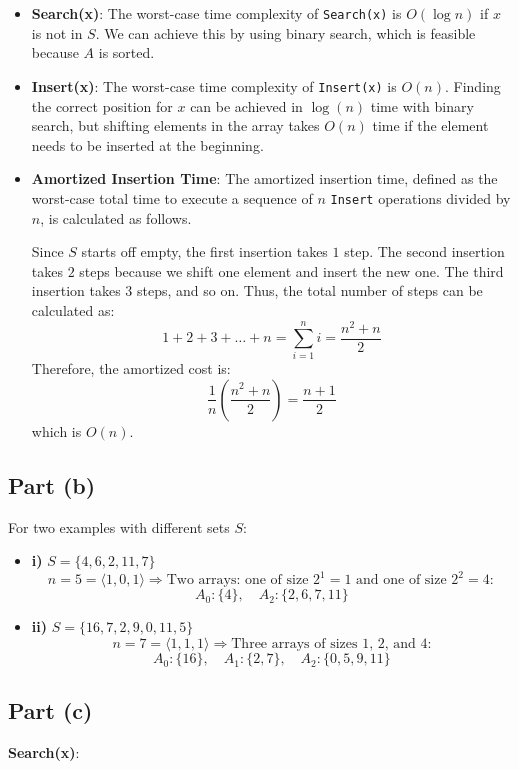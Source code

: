 \documentclass{article}
\begin{document}
\begin{itemize}
    \item \textbf{Search(x)}: The worst-case time complexity of \texttt{Search(x)} is \( O(\log n) \) if \( x \) is not in \( S \). We can achieve this by using binary search, which is feasible because \( A \) is sorted.
    \item \textbf{Insert(x)}: The worst-case time complexity of \texttt{Insert(x)} is \( O(n) \). Finding the correct position for \( x \) can be achieved in \( \log(n) \) time with binary search, but shifting elements in the array takes \( O(n) \) time if the element needs to be inserted at the beginning.
    \item \textbf{Amortized Insertion Time}: The amortized insertion time, defined as the worst-case total time to execute a sequence of \( n \) \texttt{Insert} operations divided by \( n \), is calculated as follows.

    Since \( S \) starts off empty, the first insertion takes \( 1 \) step. The second insertion takes \( 2 \) steps because we shift one element and insert the new one. The third insertion takes \( 3 \) steps, and so on. Thus, the total number of steps can be calculated as:
    \[
    1 + 2 + 3 + \dots + n = \sum_{i=1}^n i = \frac{n^2 + n}{2}
    \]
    Therefore, the amortized cost is:
    \[
    \frac{1}{n} \left( \frac{n^2 + n}{2} \right) = \frac{n + 1}{2}
    \]
    which is \( O(n) \).
\end{itemize}

\subsection*{Part (b)}
For two examples with different sets \( S \):
\begin{itemize}
    \item \textbf{i)} \( S = \{4, 6, 2, 11, 7\} \)
    \[
    n = 5 = \langle 1,0,1 \rangle \Rightarrow \text{Two arrays: one of size } 2^1 = 1 \text{ and one of size } 2^2 = 4:
    \]
    \[
    A_0: \{4\}, \quad A_2: \{2, 6, 7, 11\}
    \]

    \item \textbf{ii)} \( S = \{16, 7, 2, 9, 0, 11, 5\} \)
    \[
    n = 7 = \langle 1,1,1 \rangle \Rightarrow \text{Three arrays of sizes 1, 2, and 4:}
    \]
    \[
    A_0: \{16\}, \quad A_1: \{2, 7\}, \quad A_2: \{0, 5, 9, 11\}
    \]
\end{itemize}

\subsection*{Part (c)}
\textbf{Search(x)}:
\end{document}
